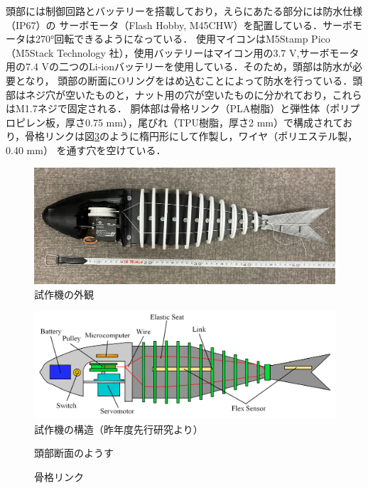 頭部には制御回路とバッテリーを搭載しており，えらにあたる部分には防水仕様（IP67）の サーボモータ（Flash Hobby, M45CHW）を配置している．サーボモータは270°回転できるようになっている．
使用マイコンはM5Stamp Pico（M5Stack Technology 社），使用バッテリーはマイコン用の3.7 V,サーボモータ用の7.4 Vの二つのLi-ionバッテリーを使用している．そのため，頭部は防水が必要となり，
頭部の断面にOリングをはめ込むことによって防水を行っている．頭部はネジ穴が空いたものと，ナット用の穴が空いたものに分かれており，これらはM1.7ネジで固定される．
胴体部は骨格リンク（PLA樹脂）と弾性体（ポリプロピレン板，厚さ0.75 mm），尾びれ（TPU樹脂，厚さ2 mm）で構成されており，骨格リンクは図\ref{fig:link_sen}のように楕円形にして作製し，ワイヤ（ポリエステル製，0.40 mm）
を通す穴を空けている．

\begin{figure}[t]
    \centering
    \includegraphics[width=0.80\linewidth]{chapters/picture/sisaku.jpg}
    \caption{試作機の外観}
    \label{fig:sisaku}
\end{figure}
\begin{figure}[t]
    \centering
    \includegraphics[width=0.80\linewidth]{chapters/picture/tentativeschematic.png}
    \caption{試作機の構造（昨年度先行研究より）}
    \label{fig:kouzou_sisaku}
\end{figure}
\begin{figure}[t]
    \centering
     \begin{minipage}[b]{0.50\linewidth}
        \centering
        \caption{頭部断面のようす}
        \label{fig:danmen}
     \end{minipage}
     \hspace{0.05\linewidth}
     \begin{minipage}[b]{0.25\linewidth}
        \centering
        \caption{骨格リンク}
        \label{fig:link_sen}
     \end{minipage}
\end{figure}

